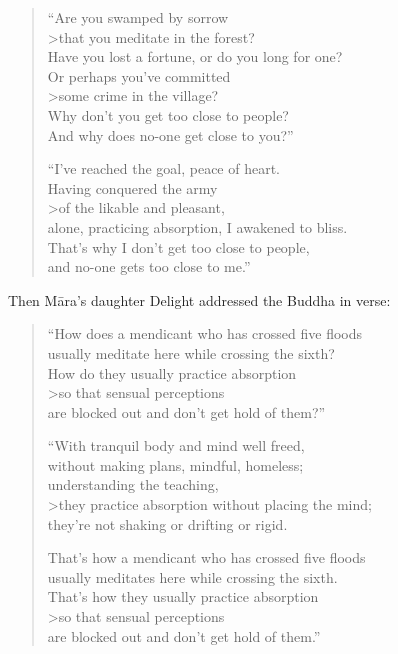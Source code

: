 \documentclass[12pt,openany]{book}%
\begin{document}
\begin{verse}%
“Are you swamped by sorrow \\>that you meditate in the forest? \\
Have you lost a fortune, or do you long for one? \\
Or perhaps you’ve committed \\>some crime in the village? \\
Why don’t you get too close to people? \\
And why does no-one get close to you?” 

“I’ve reached the goal, peace of heart. \\
Having conquered the army \\>of the likable and pleasant, \\
alone, practicing absorption, I awakened to bliss. \\
That’s why I don’t get too close to people, \\
and no-one gets too close to me.” 

%
\end{verse}

Then \textsanskrit{Māra}’s daughter Delight addressed the Buddha in verse: 

\begin{verse}%
“How does a mendicant who has crossed five floods \\
usually meditate here while crossing the sixth? \\
How do they usually practice absorption \\>so that sensual perceptions \\
are blocked out and don’t get hold of them?” 

“With tranquil body and mind well freed, \\
without making plans, mindful, homeless; \\
understanding the teaching, \\>they practice absorption without placing the mind; \\
they’re not shaking or drifting or rigid. 

That’s how a mendicant who has crossed five floods \\
usually meditates here while crossing the sixth. \\
That’s how they usually practice absorption \\>so that sensual perceptions \\
are blocked out and don’t get hold of them.” 

%
\end{verse}
\end{document}
